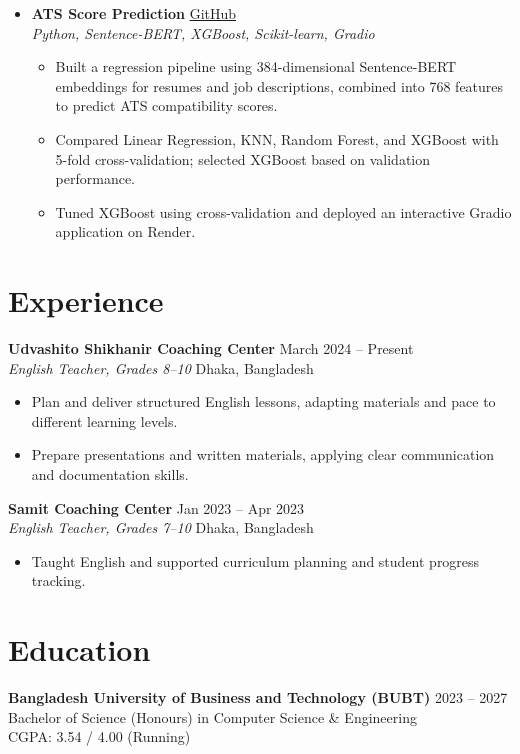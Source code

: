 \documentclass[11pt,a4paper]{article}
\begin{document}
\begin{itemize}[label=\textbullet]
    \item \textbf{ATS Score Prediction} \hfill
    \href{https://github.com/pranta2003/ATS-Score-Prediction}{GitHub}\\
    \textit{Python, Sentence-BERT, XGBoost, Scikit-learn, Gradio}
    \begin{itemize}
        \item Built a regression pipeline using 384-dimensional Sentence-BERT embeddings for resumes and job descriptions, combined into 768 features to predict ATS compatibility scores.
        \item Compared Linear Regression, KNN, Random Forest, and XGBoost with 5-fold cross-validation; selected XGBoost based on validation performance.
        \item Tuned XGBoost using cross-validation and deployed an interactive Gradio application on Render.
    \end{itemize}
\end{itemize}

\section*{Experience}
\textbf{Udvashito Shikhanir Coaching Center} \hfill March 2024 -- Present\\
\textit{English Teacher, Grades 8--10} \hfill Dhaka, Bangladesh
\begin{itemize}
    \item Plan and deliver structured English lessons, adapting materials and pace to different learning levels.
    \item Prepare presentations and written materials, applying clear communication and documentation skills.
\end{itemize}

\textbf{Samit Coaching Center} \hfill Jan 2023 -- Apr 2023\\
\textit{English Teacher, Grades 7--10} \hfill Dhaka, Bangladesh
\begin{itemize}
    \item Taught English and supported curriculum planning and student progress tracking.
\end{itemize}

\section*{Education}
\textbf{Bangladesh University of Business and Technology (BUBT)} \hfill 2023 -- 2027\\
Bachelor of Science (Honours) in Computer Science \& Engineering\\
CGPA: 3.54 / 4.00 (Running)
\end{document}
